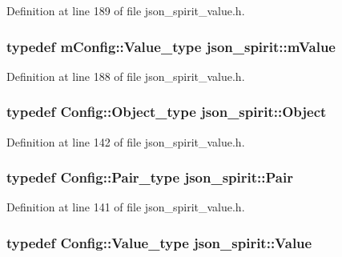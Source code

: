 Definition at line 189 of file json\+\_\+spirit\+\_\+value.\+h.

\hypertarget{namespacejson__spirit_a4dfd55710919c7c5e20fcbe4e4fe7b46}{}
\subsubsection[{m\+Value}]{\setlength{\rightskip}{0pt plus 5cm}typedef {\bf m\+Config\+::\+Value\+\_\+type} {\bf json\+\_\+spirit\+::m\+Value}}\label{namespacejson__spirit_a4dfd55710919c7c5e20fcbe4e4fe7b46}


Definition at line 188 of file json\+\_\+spirit\+\_\+value.\+h.

\hypertarget{namespacejson__spirit_aa1e2c4032be0d25e7b42eb17115dabb2}{}
\subsubsection[{Object}]{\setlength{\rightskip}{0pt plus 5cm}typedef {\bf Config\+::\+Object\+\_\+type} {\bf json\+\_\+spirit\+::\+Object}}\label{namespacejson__spirit_aa1e2c4032be0d25e7b42eb17115dabb2}


Definition at line 142 of file json\+\_\+spirit\+\_\+value.\+h.

\hypertarget{namespacejson__spirit_a7200dfb0c24dea92f37dfd20c1a354c1}{}
\subsubsection[{Pair}]{\setlength{\rightskip}{0pt plus 5cm}typedef {\bf Config\+::\+Pair\+\_\+type} {\bf json\+\_\+spirit\+::\+Pair}}\label{namespacejson__spirit_a7200dfb0c24dea92f37dfd20c1a354c1}


Definition at line 141 of file json\+\_\+spirit\+\_\+value.\+h.

\hypertarget{namespacejson__spirit_a28e6abc99fda7b06c430ca38802527a3}{}
\subsubsection[{Value}]{\setlength{\rightskip}{0pt plus 5cm}typedef {\bf Config\+::\+Value\+\_\+type} {\bf json\+\_\+spirit\+::\+Value}}\label{namespacejson__spirit_a28e6abc99fda7b06c430ca38802527a3}



